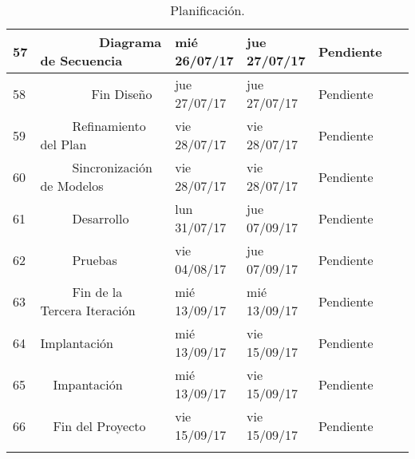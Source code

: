 \begin{center}
\begin{longtable}{ l l l l l l}
	57 &         Diagrama de Secuencia & mié 26/07/17 & jue 27/07/17 & Pendiente & \  \\ \hline
	58 &         Fin Diseño & jue 27/07/17 & jue 27/07/17 & Pendiente & \  \\ \hline
	59 &      Refinamiento del Plan & vie 28/07/17 & vie 28/07/17 & Pendiente & \  \\ \hline
	60 &      Sincronización de Modelos & vie 28/07/17 & vie 28/07/17 & Pendiente & \  \\ \hline
	61 &      Desarrollo & lun 31/07/17 & jue 07/09/17 & Pendiente & \  \\ \hline
	62 &      Pruebas & vie 04/08/17 & jue 07/09/17 & Pendiente & \  \\ \hline
	63 &      Fin de la Tercera Iteración & mié 13/09/17 & mié 13/09/17 & Pendiente & \  \\ \hline
	64 & Implantación & mié 13/09/17 & vie 15/09/17 & Pendiente & \  \\ \hline
	65 &   Impantación & mié 13/09/17 & vie 15/09/17 & Pendiente & \  \\ \hline
	66 &   Fin del Proyecto & vie 15/09/17 & vie 15/09/17 & Pendiente & \  \\ \hline
\caption{Planificación.}
\label{tab:Planificación}
\end{longtable}
\end{center}

\newpage
